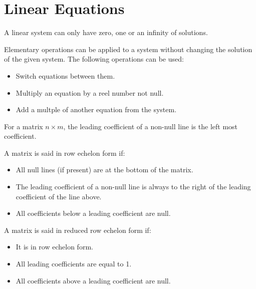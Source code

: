 \chapter{Linear Equations}


\begin{theorem}
    A linear system can only have zero, one or an infinity of solutions.
\end{theorem}

\begin{theorem}
    Elementary operations can be applied to a system without changing the solution of the given system. The following operations can be used:

    \begin{itemize}[itemsep=1pt,label=$\circ$]
        \item Switch equations between them.
        \item Multiply an equation by a reel number not null.
        \item Add a multple of another equation from the system.
    \end{itemize}
\end{theorem}

\begin{definition}
    For a matrix $n \times m$, the leading coefficient of a non-null line is the left most coefficient.
\end{definition}

\begin{definition}
    A matrix is said in row echelon form if:

    \begin{itemize}[itemsep=1pt,label=$\circ$]
        \item All null lines (if present) are at the bottom of the matrix.
        \item The leading coefficient of a non-null line is always to the right of the leading coefficient of the line above.
        \item All coefficients below a leading coefficient are null.
    \end{itemize}
\end{definition}

\begin{definition}
    A matrix is said in reduced row echelon form if:

    \begin{itemize}[itemsep=1pt,label=$\circ$]
        \item It is in row echelon form.
        \item All leading coefficients are equal to 1.
        \item All coefficients above a leading coefficient are null.
    \end{itemize}
\end{definition}

